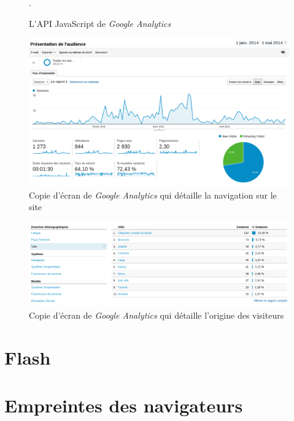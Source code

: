\begin{figure}[h]
	\centering
	
	\caption{\label{js_google_analytics}L'API JavaScript de \textit{Google Analytics}}.
\end{figure}

\begin{figure}[h]
	\centering
	\includegraphics[scale=0.4]{examples/Google_Analytics_1.png}
	\caption{\label{Google_Analytics_1}Copie d'écran de \textit{Google Analytics} qui détaille la navigation sur le site}
\end{figure}

\begin{figure}[h]
	\centering
	\includegraphics[scale=0.4]{examples/Google_Analytics_2.png}
	\caption{\label{Google_Analytics_2}Copie d'écran de \textit{Google Analytics} qui détaille l'origine des visiteurs}
\end{figure}

\section{Flash}



\section{Empreintes des navigateurs}
\label{fingerprinters}
